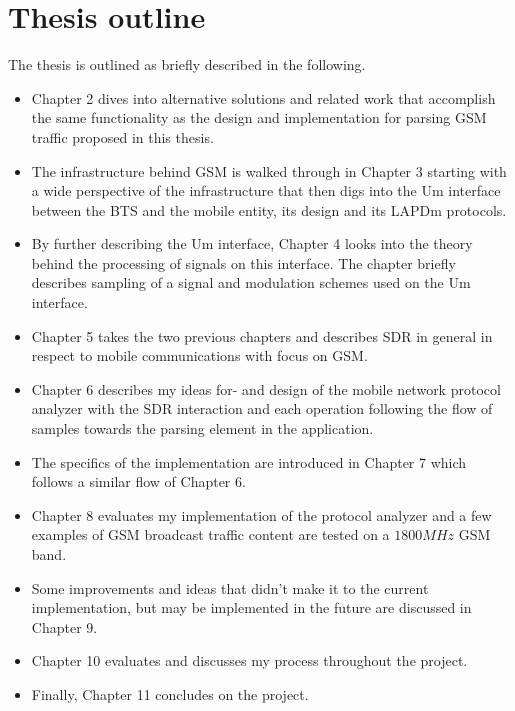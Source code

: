 \section{Thesis outline}
The thesis is outlined as briefly described in the following.
\begin{itemize}
\item Chapter 2 dives into alternative solutions and related work that
  accomplish the same functionality as the design and implementation
  for parsing \gls{GSM} traffic proposed in this thesis.
\item The infrastructure behind \gls{GSM} is walked through in Chapter
  3 starting with a wide perspective of the infrastructure that then
  digs into the Um interface between the \gls{BTS} and the mobile
  entity, its design and its \gls{LAPDm} protocols.
\item By further describing the Um interface, Chapter 4 looks into the
  theory behind the processing of signals on this interface. The
  chapter briefly describes sampling of a signal and modulation
  schemes used on the Um interface.
\item Chapter 5 takes the two previous chapters and describes
  \gls{SDR} in general in respect to mobile communications with focus
  on \gls{GSM}.\
\item Chapter 6 describes my ideas for- and design of the mobile
  network protocol analyzer with the \gls{SDR} interaction and each
  operation following the flow of samples towards the parsing element
  in the application.
\item The specifics of the implementation are introduced in Chapter 7
  which follows a similar flow of Chapter 6.
\item Chapter 8 evaluates my implementation of the protocol analyzer
  and a few examples of \gls{GSM} broadcast traffic content are tested
  on a $1800\si{MHz}$ \gls{GSM} band.
\item Some improvements and ideas that didn't make it to the current
  implementation, but may be implemented in the future are discussed
  in Chapter 9.
\item Chapter 10 evaluates and discusses my process throughout the
  project.
\item Finally, Chapter 11 concludes on the project.
\end{itemize}